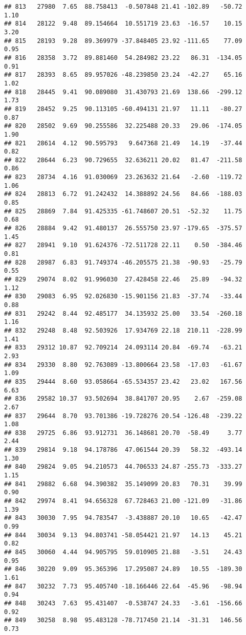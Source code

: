 \documentclass[]{article}
\begin{document}
\begin{verbatim}
## 813   27980  7.65  88.758413  -0.507848 21.41 -102.89   -50.72  1.10
## 814   28122  9.48  89.154664  10.551719 23.63  -16.57    10.15  3.20
## 815   28193  9.28  89.369979 -37.848405 23.92 -111.65    77.09  0.95
## 816   28358  3.72  89.881460  54.284982 23.22   86.31  -134.05  0.91
## 817   28393  8.65  89.957026 -48.239850 23.24  -42.27    65.16  1.02
## 818   28445  9.41  90.089080  31.430793 21.69  138.66  -299.12  1.73
## 819   28452  9.25  90.113105 -60.494131 21.97   11.11   -80.27  0.87
## 820   28502  9.69  90.255586  32.225488 20.33   29.06  -174.05  1.90
## 821   28614  4.12  90.595793   9.647368 21.49   14.19   -37.44  0.82
## 822   28644  6.23  90.729655  32.636211 20.02   81.47  -211.58  0.86
## 823   28734  4.16  91.030069  23.263632 21.64   -2.60  -119.72  1.06
## 824   28813  6.72  91.242432  14.388892 24.56   84.66  -188.03  0.85
## 825   28869  7.84  91.425335 -61.748607 20.51  -52.32    11.75  0.68
## 826   28884  9.42  91.480137  26.555750 23.97 -179.65  -375.57  1.45
## 827   28941  9.10  91.624376 -72.511728 22.11    0.50  -384.46  0.81
## 828   28987  6.83  91.749374 -46.205575 21.38  -90.93   -25.79  0.55
## 829   29074  8.02  91.996030  27.428458 22.46   25.89   -94.32  1.12
## 830   29083  6.95  92.026830 -15.901156 21.83  -37.74   -33.44  0.88
## 831   29242  8.44  92.485177  34.135932 25.00   33.54  -260.18  1.16
## 832   29248  8.48  92.503926  17.934769 22.18  210.11  -228.99  1.41
## 833   29312 10.87  92.709214  24.093114 20.84  -69.74   -63.21  2.93
## 834   29330  8.80  92.763089 -13.800664 23.58  -17.03   -61.67  1.09
## 835   29444  8.60  93.058664 -65.534357 23.42   23.02   167.56  6.63
## 836   29582 10.37  93.502694  38.841707 20.95    2.67  -259.08  2.67
## 837   29644  8.70  93.701386 -19.728276 20.54 -126.48  -239.22  1.08
## 838   29725  6.86  93.912731  36.148681 20.70  -58.49     3.77  2.44
## 839   29814  9.18  94.178786  47.061544 20.39   58.32  -493.14  1.30
## 840   29824  9.05  94.210573  44.706533 24.87 -255.73  -333.27  1.15
## 841   29882  6.68  94.390382  35.149099 20.83   70.31    39.99  0.90
## 842   29974  8.41  94.656328  67.728463 21.00 -121.09   -31.86  1.39
## 843   30030  7.95  94.783547  -3.438887 20.10   10.65   -42.47  0.99
## 844   30034  9.13  94.803741 -58.054421 21.97   14.13    45.21  0.82
## 845   30060  4.44  94.905795  59.010905 21.88   -3.51    24.43  0.95
## 846   30220  9.09  95.365396  17.295087 24.89   10.55  -189.30  1.61
## 847   30232  7.73  95.405740 -18.166446 22.64  -45.96   -98.94  0.94
## 848   30243  7.63  95.431407  -0.538747 24.33   -3.61  -156.66  0.92
## 849   30258  8.98  95.483128 -78.717450 21.14  -31.31   146.56  0.73

\end{verbatim}
\end{document}
